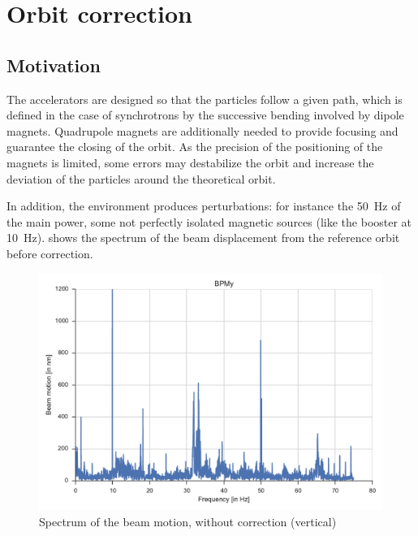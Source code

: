 
\chapter{Orbit correction}
\label{sec:correction}

\section{Motivation}
The accelerators are designed so that the particles follow a given path, which is defined in the case of synchrotrons by the successive bending involved by dipole magnets. Quadrupole magnets are additionally needed to provide focusing and guarantee the closing of the orbit. As the precision of the positioning of the magnets is limited, some errors may destabilize the orbit and increase the deviation of the particles around the theoretical orbit.

In addition, the environment produces perturbations: for instance the 50~Hz of the main power, some not perfectly isolated magnetic sources (like the booster at \SI{10}{\hertz}).  shows the spectrum of the beam displacement from the reference orbit before correction. 
\begin{figure}
	\centering
	\includegraphics[width=.9\linewidth]{img/fft_no_corr}
	\caption{\label{fig:fft_no_correction} Spectrum of the beam motion, without correction (vertical)}
\end{figure}


